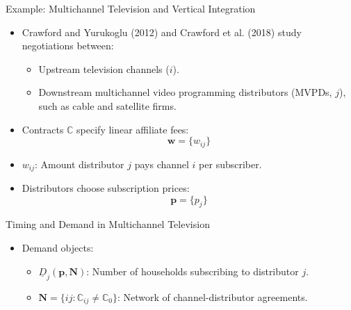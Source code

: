 \documentclass[aspectratio=169]{beamer}  %
\begin{document}
\begin{frame}{Example: Multichannel Television and Vertical Integration}
    \begin{itemize}
        \item Crawford and Yurukoglu (2012) and Crawford et al. (2018) study negotiations between:
        \begin{itemize}
            \item Upstream television channels (\(i\)).
            \item Downstream multichannel video programming distributors (MVPDs, \(j\)), such as cable and satellite firms.
        \end{itemize}
        \item Contracts \(\mathbb{C}\) specify linear affiliate fees:
        \[
        \boldsymbol{w} = \{w_{ij}\}
        \]
        \item \(w_{ij}\): Amount distributor \(j\) pays channel \(i\) per subscriber.
        \item Distributors choose subscription prices:
        \[
        \boldsymbol{p} = \{p_j\}
        \]
    \end{itemize}
\end{frame}

\begin{frame}{Timing and Demand in Multichannel Television}
    \begin{itemize}
        \item Demand objects:
        \begin{itemize}
            \item \(\underline{D}_j(\boldsymbol{p}, \boldsymbol{N})\): Number of households subscribing to distributor \(j\).
            \item \(\boldsymbol{N} = \{ij : \mathbb{C}_{ij} \neq \mathbb{C}_0\}\): Network of channel-distributor agreements.
        \end{itemize}
    \end{itemize}
\end{frame}
\end{document}
